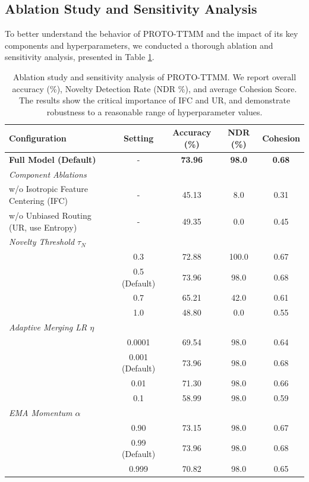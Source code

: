 \documentclass[twoside]{article}
\begin{document}
\subsection{Ablation Study and Sensitivity Analysis}

To better understand the behavior of PROTO-TTMM and the impact of its key components and hyperparameters, we conducted a thorough ablation and sensitivity analysis, presented in Table \ref{tab:ablation}.

\begin{table}[t]
\caption{Ablation study and sensitivity analysis of PROTO-TTMM. We report overall accuracy (\%), Novelty Detection Rate (NDR \%), and average Cohesion Score. The results show the critical importance of IFC and UR, and demonstrate robustness to a reasonable range of hyperparameter values.}
\label{tab:ablation}
\vskip 0.15in
\begin{center}
\begin{small}
\begin{sc}
\begin{tabular}{lcccc}
\toprule
Configuration & Setting & Accuracy (\%) & NDR (\%) & Cohesion \\
\midrule
\textbf{Full Model (Default)} & - & \textbf{73.96} & \textbf{98.0} & \textbf{0.68} \\
\midrule
\textit{Component Ablations} & & & & \\
w/o Isotropic Feature Centering (IFC) & - & 45.13 & 8.0 & 0.31 \\
w/o Unbiased Routing (UR, use Entropy) & - & 49.35 & 0.0 & 0.45 \\
\midrule
\textit{Novelty Threshold $\tau_N$} & & & & \\
 & 0.3 & 72.88 & 100.0 & 0.67 \\
 & 0.5 (Default) & 73.96 & 98.0 & 0.68 \\
 & 0.7 & 65.21 & 42.0 & 0.61 \\
 & 1.0 & 48.80 & 0.0 & 0.55 \\
\midrule
\textit{Adaptive Merging LR $\eta$} & & & & \\
 & 0.0001 & 69.54 & 98.0 & 0.64 \\
 & 0.001 (Default) & 73.96 & 98.0 & 0.68 \\
 & 0.01 & 71.30 & 98.0 & 0.66 \\
 & 0.1 & 58.99 & 98.0 & 0.59 \\
\midrule
\textit{EMA Momentum $\alpha$} & & & & \\
 & 0.90 & 73.15 & 98.0 & 0.67 \\
 & 0.99 (Default) & 73.96 & 98.0 & 0.68 \\
 & 0.999 & 70.82 & 98.0 & 0.65 \\
\bottomrule
\end{tabular}
\end{sc}
\end{small}
\end{center}
\vskip -0.1in
\end{table}
\end{document}
